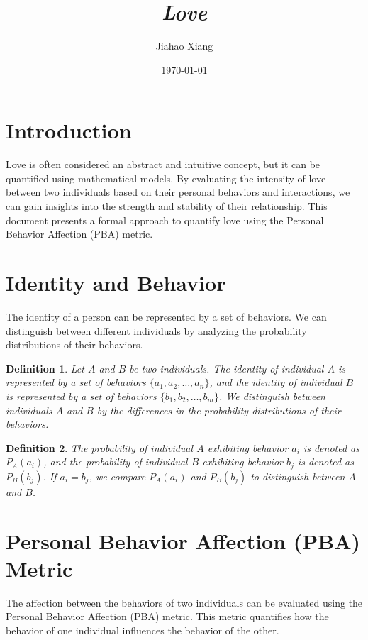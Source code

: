 \documentclass{article}
\title{\textit{Love}}
\author{Jiahao Xiang}
\date{\today}
\newtheorem{definition}{Definition}
\begin{document}
\maketitle

\section{Introduction}
Love is often considered an abstract and intuitive concept, but it can be quantified using mathematical models. By evaluating the intensity of love between two individuals based on their personal behaviors and interactions, we can gain insights into the strength and stability of their relationship. This document presents a formal approach to quantify love using the Personal Behavior Affection (PBA) metric.

\section{Identity and Behavior}
The identity of a person can be represented by a set of behaviors. We can distinguish between different individuals by analyzing the probability distributions of their behaviors.

\begin{definition}
    Let $A$ and $B$ be two individuals. The identity of individual $A$ is represented by a set of behaviors $\{a_1, a_2, \dots, a_n\}$, and the identity of individual $B$ is represented by a set of behaviors $\{b_1, b_2, \dots, b_m\}$. We distinguish between individuals $A$ and $B$ by the differences in the probability distributions of their behaviors.
\end{definition}

\begin{definition}
    The probability of individual $A$ exhibiting behavior $a_i$ is denoted as $P_A(a_i)$, and the probability of individual $B$ exhibiting behavior $b_j$ is denoted as $P_B(b_j)$. If $a_i = b_j$, we compare $P_A(a_i)$ and $P_B(b_j)$ to distinguish between $A$ and $B$.
\end{definition}

\section{Personal Behavior Affection (PBA) Metric}
The affection between the behaviors of two individuals can be evaluated using the Personal Behavior Affection (PBA) metric. This metric quantifies how the behavior of one individual influences the behavior of the other.
\end{document}

